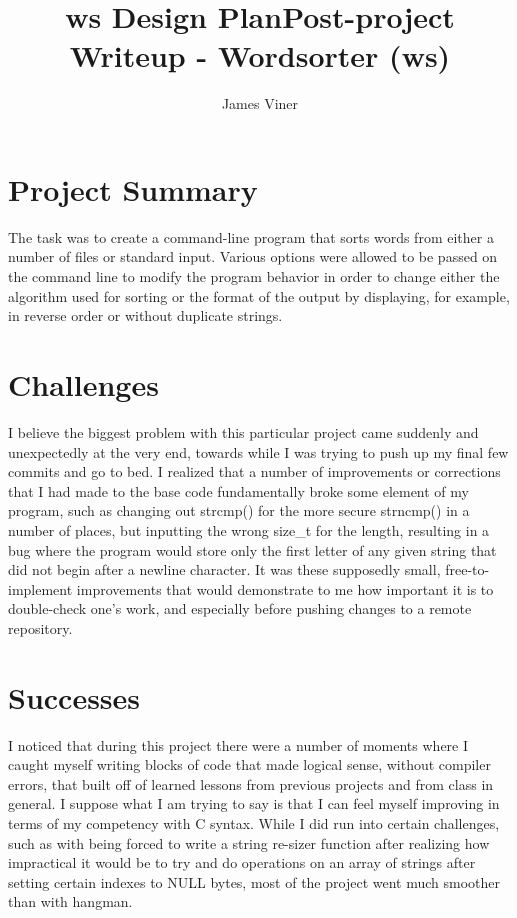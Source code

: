 \documentclass[11pt]{report}
\title{ws Design Plan}
\begin{document}
\title{Post-project Writeup - Wordsorter (ws)}
\author{James Viner}
\date{} %

\maketitle

\section*{Project Summary}
The task was to create a command-line program that sorts words from either a number of files or standard input. Various options were allowed to be passed on the command line to modify the program behavior in order to change either the algorithm used for sorting or the format of the output by displaying, for example, in reverse order or without duplicate strings.
\section*{Challenges}
I believe the biggest problem with this particular project came suddenly and unexpectedly at the very end, towards while I was trying to push up my final few commits and go to bed. I realized that a number of improvements or corrections that I had made to the base code fundamentally broke some element of my program, such as changing out strcmp() for the more secure strncmp() in a number of places, but inputting the wrong size\_t for the length, resulting in a bug where the program would store only the first letter of any given string that did not begin after a newline character. It was these supposedly small, free-to-implement improvements that would demonstrate to me how important it is to double-check one's work, and especially before pushing changes to a remote repository.
\section*{Successes}
I noticed that during this project there were a number of moments where I caught myself writing blocks of code that made logical sense, without compiler errors, that built off of learned lessons from previous projects and from class in general. I suppose what I am trying to say is that I can feel myself improving in terms of my competency with C syntax. While I did run into certain challenges, such as with being forced to write a string re-sizer function after realizing how impractical it would be to try and do operations on an array of strings after setting certain indexes to NULL bytes, most of the project went much smoother than with hangman.
\end{document}
